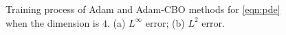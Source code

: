 \documentclass{beamer}
\begin{document}
\begin{frame}
	\begin{figure}
	\caption{Training process of Adam and Adam-CBO methods for \eqref{eqn:pde} when the dimension is $4$. (a) $L^{\infty}$ error; (b) $L^2$ error.}
	\label{fig:training process singular problem}
\end{figure}

\end{frame}
\end{document}
